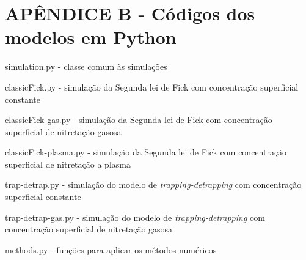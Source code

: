 \section*{APÊNDICE B - Códigos dos modelos em Python}
\label{sec:anexo-codigos}
\begin{changemargin}{-2cm}{-1.5cm}    

\noindent simulation.py - classe comum às simulações

\noindent classicFick.py - simulação da Segunda lei de Fick com concentração superficial constante

\noindent classicFick-gas.py - simulação da Segunda lei de Fick com concentração superficial de nitretação gasosa

\noindent classicFick-plasma.py - simulação da Segunda lei de Fick com concentração superficial de nitretação a plasma

\noindent trap-detrap.py - simulação do modelo de \textit{trapping-detrapping} com concentração superficial constante

\noindent trap-detrap-gas.py - simulação do modelo de \textit{trapping-detrapping} com concentração superficial de nitretação gasosa

\noindent methods.py -  funções para aplicar os métodos numéricos



\end{changemargin}